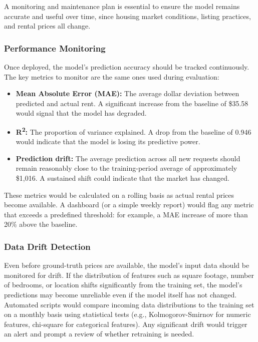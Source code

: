 \noindent
A monitoring and maintenance plan is essential to ensure the model remains accurate and useful over time, since housing market conditions, listing practices, and rental prices all change.

\subsubsection{Performance Monitoring}

\noindent
Once deployed, the model's prediction accuracy should be tracked continuously. The key metrics to monitor are the same ones used during evaluation:

\begin{itemize}
    \item \textbf{Mean Absolute Error (MAE):} The average dollar deviation between predicted and actual rent. A significant increase from the baseline of \$35.58 would signal that the model has degraded.
    \item \textbf{R\textsuperscript{2}:} The proportion of variance explained. A drop from the baseline of 0.946 would indicate that the model is losing its predictive power.
    \item \textbf{Prediction drift:} The average prediction across all new requests should remain reasonably close to the training-period average of approximately \$1,016. A sustained shift could indicate that the market has changed.
\end{itemize}

\noindent
These metrics would be calculated on a rolling basis as actual rental prices become available. A dashboard (or a simple weekly report) would flag any metric that exceeds a predefined threshold: for example, a MAE increase of more than 20\% above the baseline.

\subsubsection{Data Drift Detection}

\noindent
Even before ground-truth prices are available, the model's input data should be monitored for drift. If the distribution of features such as square footage, number of bedrooms, or location shifts significantly from the training set, the model's predictions may become unreliable even if the model itself has not changed. Automated scripts would compare incoming data distributions to the training set on a monthly basis using statistical tests (e.g., Kolmogorov-Smirnov for numeric features, chi-square for categorical features). Any significant drift would trigger an alert and prompt a review of whether retraining is needed.

